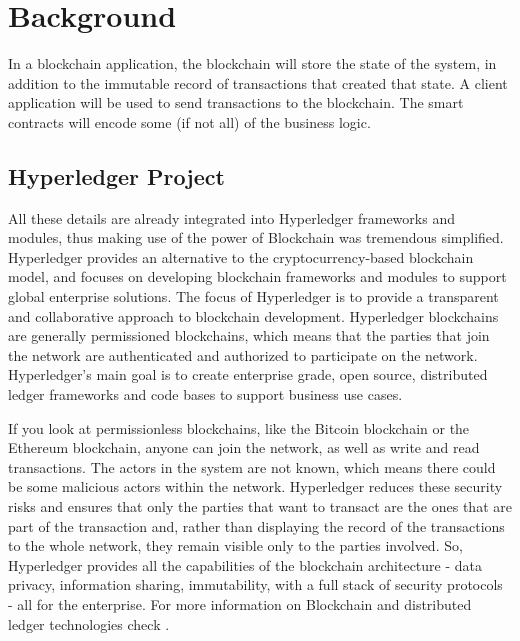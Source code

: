 \chapter{Background}
\label{chapter:chapter2}

In a blockchain application, the blockchain will store the state of the system, in addition to the immutable record of transactions that created that state. A client application will be used to send transactions to the blockchain. The smart contracts will encode some (if not all) of the business logic.

\section{Hyperledger Project}
\label{sub-sec:chapter1-section1}

All these details are already integrated into Hyperledger frameworks and modules, thus making use of the power of Blockchain was tremendous simplified. Hyperledger provides an alternative to the cryptocurrency-based blockchain model, and focuses on developing blockchain frameworks and modules to support global enterprise solutions. The focus of Hyperledger is to provide a transparent and collaborative approach to blockchain development.
Hyperledger blockchains are generally permissioned blockchains, which means that the parties that join the network are authenticated and authorized to participate on the network. Hyperledger’s main goal is to create enterprise grade, open source, distributed ledger frameworks and code bases to support business use cases.

If you look at permissionless blockchains, like the Bitcoin blockchain or the Ethereum blockchain, anyone can join the network, as well as write and read transactions. The actors in the system are not known, which means there could be some malicious actors within the network.
Hyperledger reduces these security risks and ensures that only the parties that want to transact are the ones that are part of the transaction and, rather than displaying the record of the transactions to the whole network, they remain visible only to the parties involved. So, Hyperledger provides all the capabilities of the blockchain architecture - data privacy, information sharing, immutability, with a full stack of security protocols - all for the enterprise. For more information on Blockchain and distributed ledger technologies check \cite{isotc307blockch}.

